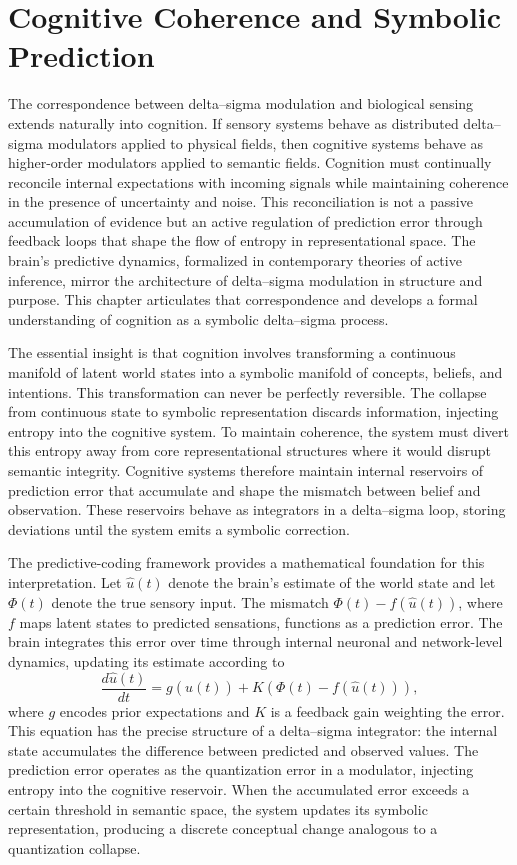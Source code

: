 
\chapter{Cognitive Coherence and Symbolic Prediction}

The correspondence between delta–sigma modulation and biological sensing extends naturally into cognition. If sensory systems behave as distributed delta–sigma modulators applied to physical fields, then cognitive systems behave as higher-order modulators applied to semantic fields. Cognition must continually reconcile internal expectations with incoming signals while maintaining coherence in the presence of uncertainty and noise. This reconciliation is not a passive accumulation of evidence but an active regulation of prediction error through feedback loops that shape the flow of entropy in representational space. The brain’s predictive dynamics, formalized in contemporary theories of active inference, mirror the architecture of delta–sigma modulation in structure and purpose. This chapter articulates that correspondence and develops a formal understanding of cognition as a symbolic delta–sigma process.

The essential insight is that cognition involves transforming a continuous manifold of latent world states into a symbolic manifold of concepts, beliefs, and intentions. This transformation can never be perfectly reversible. The collapse from continuous state to symbolic representation discards information, injecting entropy into the cognitive system. To maintain coherence, the system must divert this entropy away from core representational structures where it would disrupt semantic integrity. Cognitive systems therefore maintain internal reservoirs of prediction error that accumulate and shape the mismatch between belief and observation. These reservoirs behave as integrators in a delta–sigma loop, storing deviations until the system emits a symbolic correction.

The predictive-coding framework provides a mathematical foundation for this interpretation. Let \( \hat{u}(t) \) denote the brain’s estimate of the world state and let \( \Phi(t) \) denote the true sensory input. The mismatch \( \Phi(t) - f(\hat{u}(t)) \), where \( f \) maps latent states to predicted sensations, functions as a prediction error. The brain integrates this error over time through internal neuronal and network-level dynamics, updating its estimate according to
\[
\frac{d \hat{u}(t)}{dt} = g(\hat{u}(t)) + K \left( \Phi(t) - f(\hat{u}(t)) \right),
\]
where \( g \) encodes prior expectations and \( K \) is a feedback gain weighting the error. This equation has the precise structure of a delta–sigma integrator: the internal state accumulates the difference between predicted and observed values. The prediction error operates as the quantization error in a modulator, injecting entropy into the cognitive reservoir. When the accumulated error exceeds a certain threshold in semantic space, the system updates its symbolic representation, producing a discrete conceptual change analogous to a quantization collapse.

